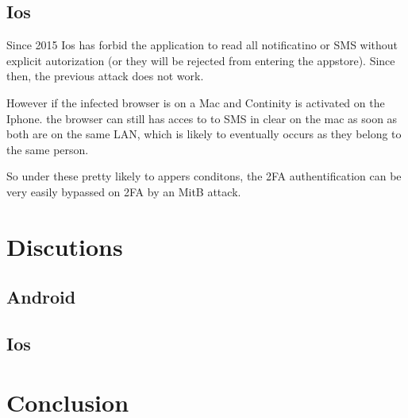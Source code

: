 \documentclass[11pt, a4paper,twocolumn]{article}
\begin{document}
\subsection{Ios}
Since 2015 Ios has forbid the application to read all 
notificatino or SMS without explicit autorization (or they will be rejected from entering the appstore). 
Since then, the previous attack does not work. 

However if the infected browser is on a Mac and Continity 
is activated on the Iphone. the browser can still has acces to to SMS in clear 
on the mac as soon as both are on the same LAN, which is likely to eventually occurs
as they belong to the same person. 

So under these pretty likely to appers conditons, the 2FA authentification can 
be very easily bypassed on 2FA by an MitB attack.


\section{Discutions} 
\subsection{Android}
\subsection{Ios}
\section{Conclusion}

% 
%
\end{document}
